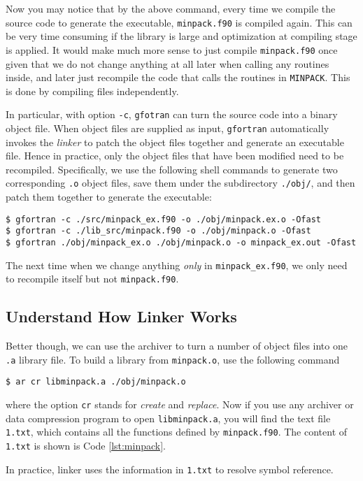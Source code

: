 \documentclass[twoside,11pt,leqno]{article}
\newcommand{\code}{\texttt}
\begin{document}
Now you may notice that by the above command, every time we compile the source code to generate the executable, \code{minpack.f90} is compiled again. This can be very time consuming if the library is large and optimization at compiling stage is applied. It would make much more sense to just compile \code{minpack.f90} once given that we do not change anything at all later when calling any routines inside, and later just recompile the code that calls the routines in \code{MINPACK}. This is done by compiling files independently.

In particular, with option \code{-c}, \code{gfotran} can turn the source code into a binary object file. When object files are supplied as input, \code{gfortran} automatically invokes the \textit{linker} to patch the object files together and generate an executable file. Hence in practice, only the object files that have been modified need to be recompiled. Specifically, we use the following shell commands to generate two corresponding \code{.o} object files, save them under the subdirectory \code{./obj/}, and then patch them together to generate the executable:
\begin{verbatim}
$ gfortran -c ./src/minpack_ex.f90 -o ./obj/minpack.ex.o -Ofast
$ gfortran -c ./lib_src/minpack.f90 -o ./obj/minpack.o -Ofast
$ gfortran ./obj/minpack_ex.o ./obj/minpack.o -o minpack_ex.out -Ofast
\end{verbatim}
The next time when we change anything \textit{only} in \code{minpack\_ex.f90}, we only need to recompile itself but not \code{minpack.f90}.

\subsection{Understand How Linker Works}

Better though, we can use the archiver to turn a number of object files into one \code{.a} library file. To build a library from \code{minpack.o}, use the following command
\begin{verbatim}
$ ar cr libminpack.a ./obj/minpack.o
\end{verbatim}
where the option \code{cr} stands for \textit{create} and \textit{replace}. Now if you use any archiver or data compression program to open \code{libminpack.a}, you will find the text file \code{1.txt}, which contains all the functions defined by \code{minpack.f90}. The content of \code{1.txt} is shown is Code \ref{lst:minpack}.

In practice, linker uses the information in \code{1.txt} to resolve symbol reference.
\end{document}
